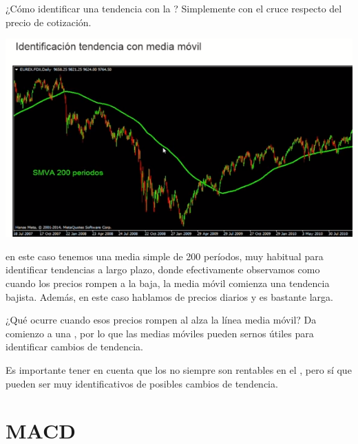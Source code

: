 ¿Cómo identificar una tendencia con la ? Simplemente con el cruce respecto del precio de cotización.
\begin{center}
    \includegraphics[scale=.80]{images/identificar-tendencia.png}
\end{center}
en este caso tenemos una media simple  de 200 períodos, muy habitual para identificar tendencias a largo plazo, donde efectivamente observamos como cuando los precios rompen a la baja, la media móvil comienza una tendencia bajista. Además, en este caso hablamos de precios diarios y es bastante larga. 

¿Qué ocurre cuando esos precios rompen al alza la línea media móvil? Da comienzo a una , por lo que las medias móviles pueden sernos útiles para identificar cambios de tendencia.

Es importante tener en cuenta que los  no siempre son rentables en el , pero sí que pueden ser muy identificativos de posibles cambios de tendencia.

\section{MACD}

